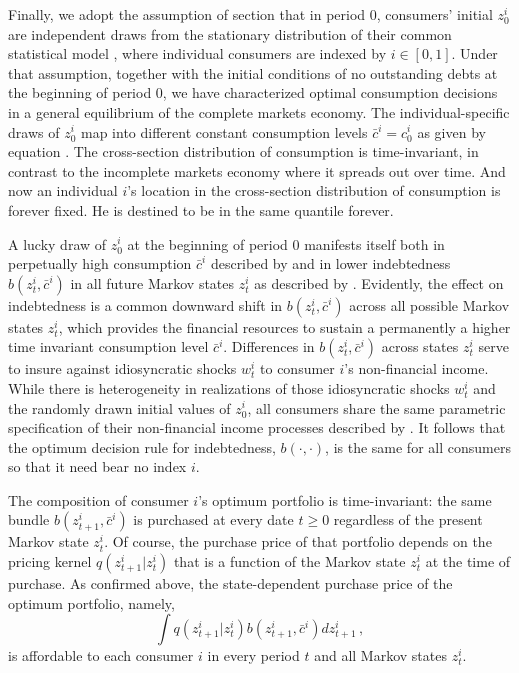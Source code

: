 Finally, we adopt the assumption of section
 that in 
period $0$, consumers' initial $z^i_0$ are 
independent draws from the stationary distribution  
of their common statistical model ,
where individual consumers are indexed by 
$i\in[0,1]$. Under that assumption,
together with the initial conditions of no
outstanding debts at the beginning of period $0$,
we have  characterized
optimal consumption decisions  in a general equilibrium of the
complete markets economy.
The individual-specific draws of $z^i_0$ map 
into different constant consumption levels 
$\bar c^i = c^i_0$ as given by equation 
. The cross-section distribution of consumption is time-invariant, in contrast to the
incomplete markets economy where it spreads out over time.  And now an individual $i$'s location in the cross-section distribution of consumption is forever fixed.  He is destined to be in the same quantile forever. 

A lucky draw of $z^i_0$ at the beginning
of period $0$ manifests itself both in perpetually 
high consumption $\bar c^i$ described  by
 and in  
lower indebtedness $b(z^i_{t}, \bar c^i)$ in 
all future Markov states $z^i_{t}$ as described  by
. Evidently, the effect on 
indebtedness is a common  downward
shift in $b(z^i_{t}, \bar c^i)$ across all 
possible Markov states $z^i_{t}$, which provides
the financial resources  to sustain a permanently 
a higher time invariant 
consumption level $\bar c^i$. Differences in 
$b(z^i_{t}, \bar c^i)$ across 
states $z^i_{t}$  serve to insure 
against idiosyncratic shocks $w^i_{t}$ to  
consumer $i$'s non-financial income.
While there is  heterogeneity in  realizations
of those idiosyncratic shocks $w^i_{t}$ and 
the randomly drawn initial values of $z^i_0$, 
all consumers share the same parametric 
specification of their non-financial income processes described by  . It follows that the 
optimum decision rule for indebtedness, 
$b(\cdot, \cdot)$, is the same for all 
consumers so that it need  bear no index $i$.

The composition of 
consumer $i$'s optimum  portfolio is time-invariant: the same bundle $b(z^i_{t+1}, \bar c^i)$
is purchased at every date $t\geq 0$ regardless
of the present Markov state $z^i_t$. Of course, the
purchase price of that portfolio depends on 
the pricing kernel $q(z^i_{t+1}|z^i_t)$ that 
is a function of the Markov state $z^i_t$ at
the time of purchase. As confirmed above,
the  state-dependent purchase price of the optimum 
portfolio, namely,  
$$
\int q(z^i_{t+1}|z^i_t) b(z^i_{t+1}, \bar c^i) d z^i_{t+1} \,,
$$
is affordable to each consumer $i$ in every 
period $t$ and all  Markov states  $z^i_t$.

